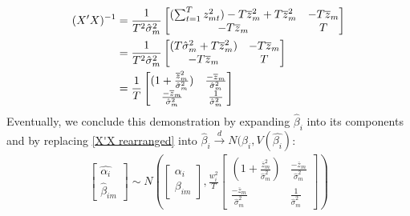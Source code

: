 \documentclass[12pt]{article}
\begin{document}
\begin{align} \label{X'X rearranged}
(X'X)^{-1} &=  \frac{1}{T^2\hat{\sigma}_{m}^2} 
				\begin{bmatrix} (\sum_{t=1}^{T}z_{mt}^2) -T\overline{z}_m^2 + T\overline{z}_m^2 & -T\overline{z}_m \\ -T\overline{z}_m & T \end{bmatrix} \notag \\
			&= 	\frac{1}{T^2\hat{\sigma}_{m}^2}
			    \begin{bmatrix} (T\hat{\sigma}_{m}^2 + T\overline{z}_m^2) & -T\overline{z}_m \\ -T\overline{z}_m & T \end{bmatrix} \notag \\
			&=  \frac{1}{T} 
				\begin{bmatrix} (1 + \frac{\overline{z}_m^2}{\hat{\sigma}_{m}^2}) & \frac{-\overline{z}_m}{\hat{\sigma}_{m}^2} \\ \frac{-\overline{z}_m}{\hat{\sigma}_{m}^2} & \frac{1}{\hat{\sigma}_{m}^2} \end{bmatrix}   
\end{align}
Eventually, we conclude this demonstration by expanding $\hat{\beta}_i$ into its components and by replacing \ref{X'X rearranged} into $\hat{\beta}_i \overset{d}{\to} N(\beta_i,V(\hat{\beta_i})$:
\begin{align}
\begin{bmatrix} \hat{\alpha_i} \\ \hat{\beta}_{im} \end{bmatrix}
\sim N(\begin{bmatrix} \alpha_i \\ \beta_{im} \end{bmatrix}, \frac{w_i^2}{T}\begin{bmatrix} (1 + \frac{\overline{z}_m^2}{\hat{\sigma}_{m}^2}) & \frac{-\overline{z}_m}{\hat{\sigma}_{m}^2} \\ \frac{-\overline{z}_m}{\hat{\sigma}_{m}^2} & \frac{1}{\hat{\sigma}_{m}^2} \end{bmatrix}) 
\end{align}
\end{document}
